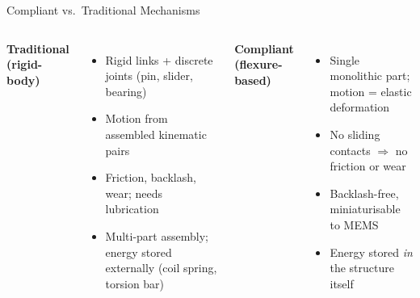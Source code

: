 
\begin{frame}{Compliant vs.\ Traditional Mechanisms}
  \small
  \begin{columns}[T]
    \textbf{Traditional (rigid-body)}
    \begin{itemize}\setlength\itemsep{2pt}
      \item Rigid links + discrete joints (pin, slider, bearing)
      \item Motion from assembled kinematic pairs
      \item Friction, backlash, wear; needs lubrication
      \item Multi-part assembly; energy stored externally
            (coil spring, torsion bar)
    \end{itemize}

    \textbf{Compliant (flexure-based)}
    \begin{itemize}\setlength\itemsep{2pt}
      \item Single monolithic part; motion = elastic deformation
            \cite{howell2001}
      \item No sliding contacts $\Rightarrow$ no friction or wear
      \item Backlash-free, miniaturisable to MEMS
            \cite{zhu2020compliant}
      \item Energy stored \emph{in} the structure itself
    \end{itemize}
  \end{columns}


\end{frame}

